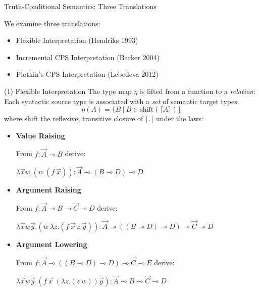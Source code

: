 \documentclass{beamer}
\newcommand{\li}{\!\multimap\!}
\newcommand{\trans}[1]{\lceil #1 \rceil}
\begin{document}
\begin{frame}{Truth-Conditional Semantics: Three Translations}
	
	We examine three translations:
	\begin{itemize}
	\item Flexible Interpretation (Hendriks 1993)
	\item Incremental CPS Interpretation (Barker 2004)
	\item Plotkin's CPS Interpretation (Lebedeva 2012)
	\end{itemize}
\end{frame}

\begin{frame}{(1) Flexible Interpretation}
	\small
	The type map $\eta$ is lifted from a function to a \textit{relation}:
	Each syntactic source type is associated with a \textit{set} of semantic target types.
	\[
		\eta(A) = \{ B \ | \ B \in \mathrm{shift}(\trans{A}) \}
	\]
	where $\mathrm{shift}$ the reflexive, transitive closure of $\trans{.}$ under the laws:
	\begin{itemize}
		\item \textbf{Value Raising}
			{\footnotesize
			\begin{flushleft}
			From $f: \vec{A}\li B$ derive:
			\end{flushleft}
			\begin{flushright}
			\vspace{-10pt}
			$\lambda \vec{x}w.(w \ (f \ \vec{x})): \vec{A} \li (B\li D) \li D$		
			\end{flushright}
			}
		\item \textbf{Argument Raising}
			{\footnotesize
			\begin{flushleft}
			From $f: \vec{A}\li B \li \vec{C}\li D$ derive:
			\end{flushleft}
			\begin{flushright}
			\vspace{-10pt}
			$\lambda \vec{x}w\vec{y}.(w \ \lambda z.(f \ \vec{x} \ z \ \vec{y})): \vec{A}\li ((B\li D)\li D) \li \vec{C} \li D$
			\end{flushright}
			}
		\item \textbf{Argument Lowering}
			{\footnotesize
			\begin{flushleft}
			 From $f: \vec{A} \li ((B\li D) \li D) \li \vec{C} \li E$ derive:		
			\end{flushleft}
			\begin{flushright}
			\vspace{-10pt}
			$\lambda \vec{x}w\vec{y}.(f \ \vec{x} \ (\lambda z. (z \ w)) \vec{y}): \vec{A} \li B \li \vec{C} \li D$
			\end{flushright}
			}
	\end{itemize}
\end{frame}
\end{document}
